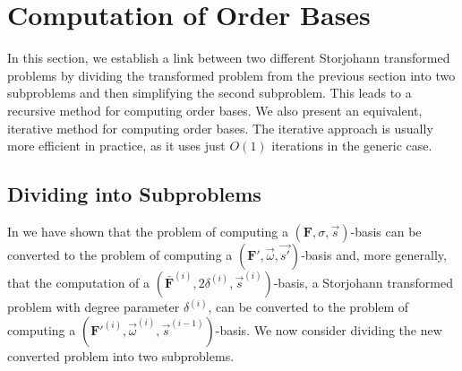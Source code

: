
\section{Computation of Order Bases}

\label{sec:Order-Basis-Computation}

In this section, we establish a link between two different Storjohann
transformed problems by dividing the transformed problem from the
previous section into two subproblems and then simplifying the second
subproblem. This leads to a recursive method for computing order bases.
We also present an equivalent, iterative method for computing order
bases. The iterative approach is usually more efficient in practice,
as it uses just $O(1)$ iterations in the generic case.


\subsection{\label{sub:Dividing-to-Subproblems}Dividing into Subproblems }

In  we have shown that the problem of computing
a $\left(\mathbf{F},\sigma,\vec{s}\right)$-basis can be converted
to the problem of computing a $(\mathbf{F}',\vec{\omega},\vec{s'})$-basis
and, more generally, that the computation of a $(\bar{\mathbf{F}}^{\left(i\right)},2\delta^{\left(i\right)},\vec{s}^{\left(i\right)})$-basis,
a Storjohann transformed problem with degree parameter $\delta^{\left(i\right)}$,
can be converted to the problem of computing a $(\mathbf{F}'^{\left(i\right)},\vec{\omega}^{\left(i\right)},\vec{s}^{\left(i-1\right)})$-basis.
We now consider dividing the new converted problem into two subproblems.

